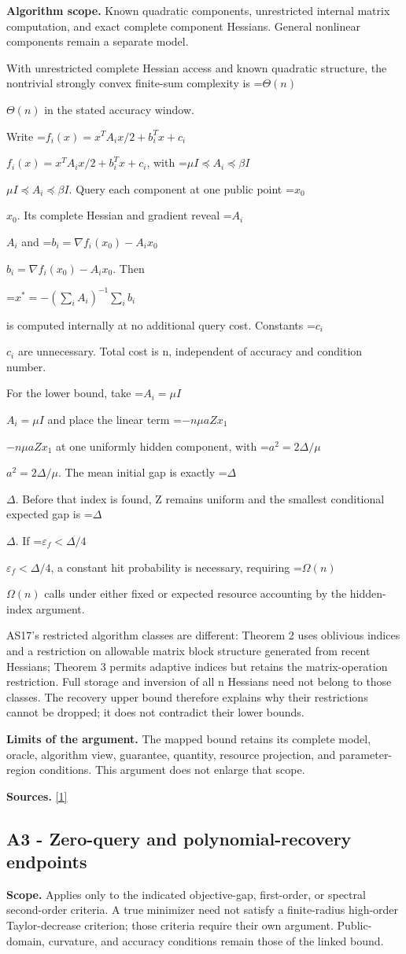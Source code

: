 \documentclass[10pt,a4paper]{article}
\newcommand{\AtlasMath}[1]{\par\begingroup\centering\setbox0=\hbox{$\displaystyle #1$}\ifdim\wd0>1.4\linewidth\typeout{ATLAS WIDE FORMULA: \the\wd0}\fi\ifdim\wd0>\linewidth\resizebox{\linewidth}{!}{\box0}\else\box0\fi\par\endgroup}
\newcommand{\AtlasInlineMath}[1]{\begingroup\setbox0=\hbox{$#1$}\ifdim\wd0>.4\linewidth\endgroup\AtlasMath{#1}\else\endgroup$#1$\fi}
\begin{document}
\textbf{Algorithm scope.} Known quadratic components, unrestricted internal matrix computation, and exact complete component Hessians. General nonlinear components remain a separate model.

With unrestricted complete Hessian access and known quadratic structure, the nontrivial strongly convex finite-sum complexity is \AtlasInlineMath{\Theta(n)} in the stated accuracy window.

Write \AtlasInlineMath{f_i(x)=x^TA_i x/2+b_i^Tx+c_i}, with \AtlasInlineMath{\mu I\preceq A_i\preceq\beta I}. Query each component at one public point \AtlasInlineMath{x_0}. Its complete Hessian and gradient reveal \AtlasInlineMath{A_i} and \AtlasInlineMath{b_i=\nabla f_i(x_0)-A_ix_0}. Then

\AtlasMath{x^*=-\left(\sum_iA_i\right)^{-1}\sum_i b_i}

is computed internally at no additional query cost. Constants \AtlasInlineMath{c_i} are unnecessary. Total cost is n, independent of accuracy and condition number.

For the lower bound, take \AtlasInlineMath{A_i=\mu I} and place the linear term \AtlasInlineMath{-n\mu aZx_1} at one uniformly hidden component, with \AtlasInlineMath{a^2=2\Delta/\mu}. The mean initial gap is exactly \AtlasInlineMath{\Delta}. Before that index is found, Z remains uniform and the smallest conditional expected gap is \AtlasInlineMath{\Delta}. If \AtlasInlineMath{\varepsilon_f<\Delta/4}, a constant hit probability is necessary, requiring \AtlasInlineMath{\Omega(n)} calls under either fixed or expected resource accounting by the hidden-index argument.

AS17's restricted algorithm classes are different: Theorem 2 uses oblivious indices and a restriction on allowable matrix block structure generated from recent Hessians; Theorem 3 permits adaptive indices but retains the matrix-operation restriction. Full storage and inversion of all n Hessians need not belong to those classes. The recovery upper bound therefore explains why their restrictions cannot be dropped; it does not contradict their lower bounds.

\textbf{Limits of the argument.} The mapped bound retains its complete model, oracle, algorithm view, guarantee, quantity, resource projection, and parameter-region conditions. This argument does not enlarge that scope.

\textbf{Sources.} \href{https://proceedings.mlr.press/v70/arjevani17a/arjevani17a.pdf}{[1]}

\subsection{A3 - Zero-query and polynomial-recovery endpoints}
\textbf{Scope.} Applies only to the indicated objective-gap, first-order, or spectral second-order criteria. A true minimizer need not satisfy a finite-radius high-order Taylor-decrease criterion; those criteria require their own argument. Public-domain, curvature, and accuracy conditions remain those of the linked bound.
\end{document}
